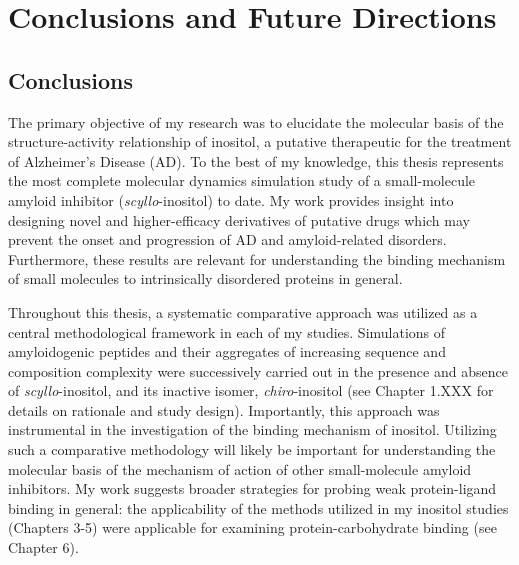 

\chapter{Conclusions and Future Directions}
\section{Conclusions}

The primary objective of my research was to elucidate the molecular basis of the structure-activity relationship of inositol, a putative therapeutic for the treatment of Alzheimer's Disease (AD). To the best of my knowledge, this thesis represents the most complete molecular dynamics simulation study of a small-molecule amyloid inhibitor (\textit{scyllo}-inositol) to date. My work provides insight into designing novel and higher-efficacy derivatives of putative drugs which may prevent the onset and progression of AD and amyloid-related disorders.  Furthermore, these results are relevant for understanding the binding mechanism of small molecules to intrinsically disordered proteins in general.

Throughout this thesis, a systematic comparative approach was utilized as a central methodological framework in each of my studies. Simulations of amyloidogenic peptides and their aggregates of increasing sequence and composition complexity were successively carried out in the presence and absence of \emph{scyllo}-inositol, and its inactive isomer, \emph{chiro}-inositol (see Chapter 1.XXX for details on rationale and study design). Importantly, this approach was instrumental in the investigation of the binding mechanism of inositol. Utilizing such a comparative methodology will likely be important for understanding the molecular basis of the mechanism of action of other small-molecule amyloid inhibitors. My work suggests broader strategies for probing weak protein-ligand binding in general: the applicability of the methods utilized in my inositol studies (Chapters 3-5) were applicable for examining protein-carbohydrate binding (see Chapter 6).


